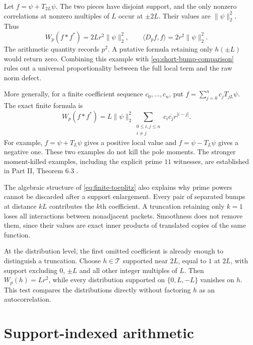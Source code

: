 \documentclass[11pt,letterpaper]{article}
\theoremstyle{definition}
\theoremstyle{remark}
\newcommand{\T}{\mathcal T}
\begin{document}
Let $f=\psi+T_{2L}\psi$. The two pieces have disjoint support, and
the only nonzero correlations at nonzero multiples of $L$ occur
at $\pm2L$. Their values are $\|\psi\|_2^2$. Thus
\begin{equation}\label{eq:second-prime-power}
 W_p(f*f^*)=2Lr^2\|\psi\|_2^2,
 \qquad \langle D_pf,f\rangle=2r^2\|\psi\|_2^2.
\end{equation}
The arithmetic quantity records $p^2$. A putative formula retaining
only $h(\pm L)$ would return zero. Combining this example with
\eqref{eq:short-bump-comparison} rules out a universal proportionality
between the full local term and the raw norm defect.

More generally, for a finite coefficient sequence $c_0,\ldots,c_n$,
put $f=\sum_{j=0}^nc_jT_{jL}\psi$. The exact finite formula is
\begin{equation}\label{eq:finite-toeplitz}
 W_p(f*f^*)=L\|\psi\|_2^2
       \sum_{\substack{0\le i,j\le n\\i\ne j}}
       c_i\overline{c_j}r^{|i-j|}.
\end{equation}
For example, $f=\psi+T_L\psi$ gives a positive local value and
$f=\psi-T_L\psi$ gives a negative one. These two examples do not
kill the pole moments. The stronger moment-killed examples, including
the explicit prime $11$ witnesses, are established in Part II,
Theorem 6.3 \cite{PartII}.

The algebraic structure of \eqref{eq:finite-toeplitz} also explains
why prime powers cannot be discarded after a support enlargement.
Every pair of separated bumps at distance $kL$ contributes the
$k$th coefficient. A truncation retaining only $k=1$ loses all
interactions between nonadjacent packets. Smoothness does not remove
them, since their values are exact inner products of translated
copies of the same function.

At the distribution level, the first omitted coefficient is already
enough to distinguish a truncation. Choose $h\in\T$ supported near
$2L$, equal to $1$ at $2L$, with support excluding $0$, $\pm L$ and
all other integer multiples of $L$. Then $W_p(h)=Lr^2$, while every
distribution supported on $\{0,L,-L\}$ vanishes on $h$. This test
compares the distributions directly without factoring $h$ as an
autocorrelation.

\section{Support-indexed arithmetic}
\end{document}

